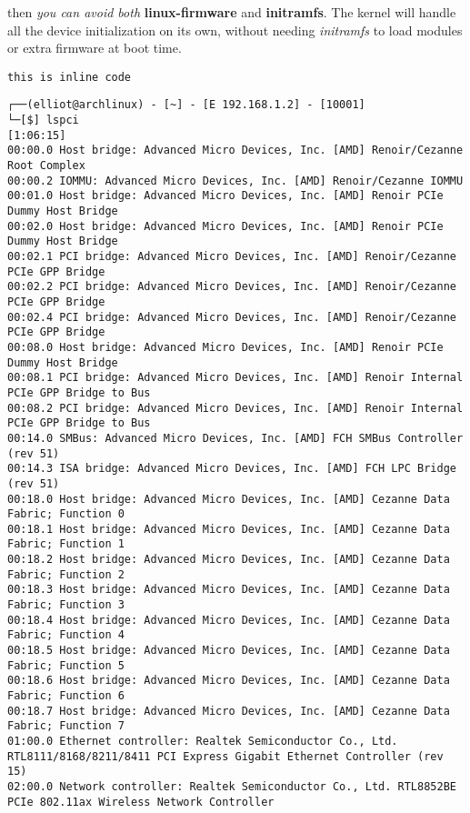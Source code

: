 then \textit{you can avoid both} \textbf{linux-firmware} and \textbf{initramfs}. The kernel will handle all the device initialization on its own, without needing \textit{initramfs} to load modules or extra firmware at boot time.

\newpage

\texttt{this is inline code}
\begin{lstlisting}[caption={Sample Code}, label={lst:sample}]
┌──(elliot@archlinux) - [~] - [E 192.168.1.2] - [10001]
└─[$] lspci                                                                                                                                    [1:06:15]
00:00.0 Host bridge: Advanced Micro Devices, Inc. [AMD] Renoir/Cezanne Root Complex
00:00.2 IOMMU: Advanced Micro Devices, Inc. [AMD] Renoir/Cezanne IOMMU
00:01.0 Host bridge: Advanced Micro Devices, Inc. [AMD] Renoir PCIe Dummy Host Bridge
00:02.0 Host bridge: Advanced Micro Devices, Inc. [AMD] Renoir PCIe Dummy Host Bridge
00:02.1 PCI bridge: Advanced Micro Devices, Inc. [AMD] Renoir/Cezanne PCIe GPP Bridge
00:02.2 PCI bridge: Advanced Micro Devices, Inc. [AMD] Renoir/Cezanne PCIe GPP Bridge
00:02.4 PCI bridge: Advanced Micro Devices, Inc. [AMD] Renoir/Cezanne PCIe GPP Bridge
00:08.0 Host bridge: Advanced Micro Devices, Inc. [AMD] Renoir PCIe Dummy Host Bridge
00:08.1 PCI bridge: Advanced Micro Devices, Inc. [AMD] Renoir Internal PCIe GPP Bridge to Bus
00:08.2 PCI bridge: Advanced Micro Devices, Inc. [AMD] Renoir Internal PCIe GPP Bridge to Bus
00:14.0 SMBus: Advanced Micro Devices, Inc. [AMD] FCH SMBus Controller (rev 51)
00:14.3 ISA bridge: Advanced Micro Devices, Inc. [AMD] FCH LPC Bridge (rev 51)
00:18.0 Host bridge: Advanced Micro Devices, Inc. [AMD] Cezanne Data Fabric; Function 0
00:18.1 Host bridge: Advanced Micro Devices, Inc. [AMD] Cezanne Data Fabric; Function 1
00:18.2 Host bridge: Advanced Micro Devices, Inc. [AMD] Cezanne Data Fabric; Function 2
00:18.3 Host bridge: Advanced Micro Devices, Inc. [AMD] Cezanne Data Fabric; Function 3
00:18.4 Host bridge: Advanced Micro Devices, Inc. [AMD] Cezanne Data Fabric; Function 4
00:18.5 Host bridge: Advanced Micro Devices, Inc. [AMD] Cezanne Data Fabric; Function 5
00:18.6 Host bridge: Advanced Micro Devices, Inc. [AMD] Cezanne Data Fabric; Function 6
00:18.7 Host bridge: Advanced Micro Devices, Inc. [AMD] Cezanne Data Fabric; Function 7
01:00.0 Ethernet controller: Realtek Semiconductor Co., Ltd. RTL8111/8168/8211/8411 PCI Express Gigabit Ethernet Controller (rev 15)
02:00.0 Network controller: Realtek Semiconductor Co., Ltd. RTL8852BE PCIe 802.11ax Wireless Network Controller

\end{lstlisting}
